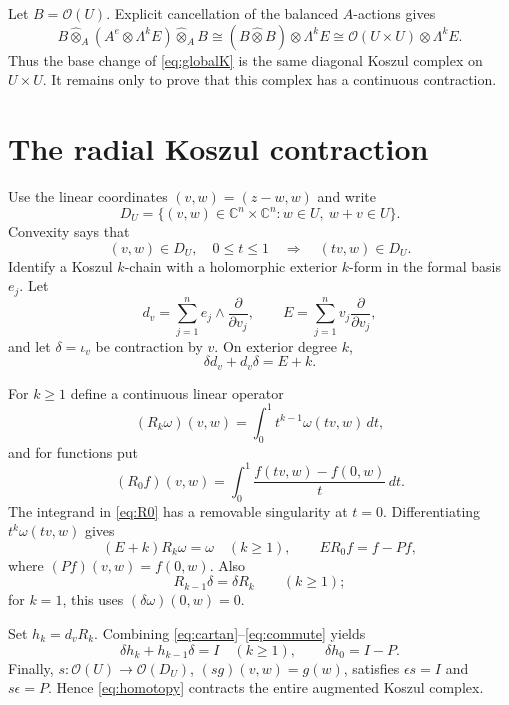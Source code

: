 \documentclass[11pt]{article}
\newcommand{\Oh}{\mathcal O}
\newcommand{\C}{\mathbb C}
\newcommand{\htens}{\widehat\otimes}
\begin{document}
Let $B=\Oh(U)$.  Explicit cancellation of the balanced $A$-actions gives
\[
 B\htens_A(A^e\otimes\Lambda^kE)\htens_A B
 \cong(B\htens B)\otimes\Lambda^kE
 \cong\Oh(U\times U)\otimes\Lambda^kE.
\]
Thus the base change of \eqref{eq:globalK} is the same diagonal Koszul
complex on $U\times U$.  It remains only to prove that this complex has a
continuous contraction.

\section{The radial Koszul contraction}

Use the linear coordinates $(v,w)=(z-w,w)$ and write
\[
 D_U=\{(v,w)\in\C^n\times\C^n:w\in U,\ w+v\in U\}.
\]
Convexity says that
\begin{equation}\label{eq:radial}
 (v,w)\in D_U,\quad 0\le t\le1
 \quad\Longrightarrow\quad (tv,w)\in D_U.
\end{equation}
Identify a Koszul $k$-chain with a holomorphic exterior $k$-form in the
formal basis $e_j$.  Let
\[
 d_v=\sum_{j=1}^ne_j\wedge\frac{\partial}{\partial v_j},
 \qquad E=\sum_{j=1}^nv_j\frac{\partial}{\partial v_j},
\]
and let $\delta=\iota_v$ be contraction by $v$.  On exterior degree $k$,
\begin{equation}\label{eq:cartan}
 \delta d_v+d_v\delta=E+k.
\end{equation}

For $k\ge1$ define a continuous linear operator
\begin{equation}\label{eq:Rk}
 (R_k\omega)(v,w)=\int_0^1t^{k-1}\omega(tv,w)\,dt,
\end{equation}
and for functions put
\begin{equation}\label{eq:R0}
 (R_0f)(v,w)=\int_0^1\frac{f(tv,w)-f(0,w)}{t}\,dt.
\end{equation}
The integrand in \eqref{eq:R0} has a removable singularity at $t=0$.
Differentiating $t^k\omega(tv,w)$ gives
\begin{equation}\label{eq:inverse}
 (E+k)R_k\omega=\omega\quad(k\ge1),\qquad
 ER_0f=f-Pf,
\end{equation}
where $(Pf)(v,w)=f(0,w)$.  Also
\begin{equation}\label{eq:commute}
 R_{k-1}\delta=\delta R_k\qquad(k\ge1);
\end{equation}
for $k=1$, this uses $(\delta\omega)(0,w)=0$.

Set $h_k=d_vR_k$.  Combining \eqref{eq:cartan}--\eqref{eq:commute} yields
\begin{equation}\label{eq:homotopy}
 \delta h_k+h_{k-1}\delta=I\quad(k\ge1),\qquad
 \delta h_0=I-P.
\end{equation}
Finally, $s:\Oh(U)\to\Oh(D_U)$, $(sg)(v,w)=g(w)$, satisfies
$\epsilon s=I$ and $s\epsilon=P$.  Hence \eqref{eq:homotopy} contracts the
entire augmented Koszul complex.
\end{document}
